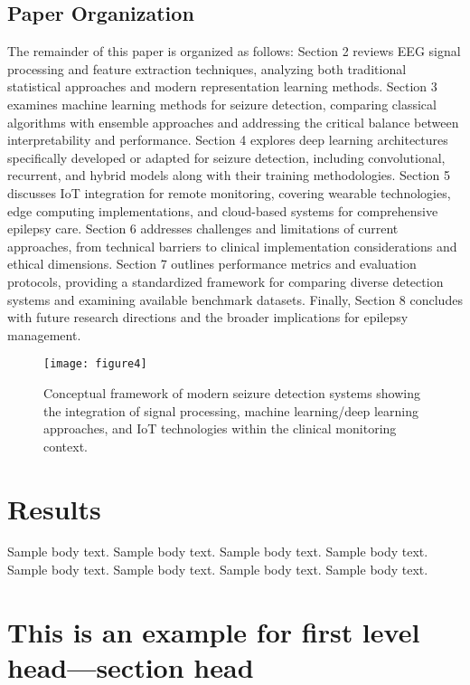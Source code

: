 \documentclass[pdflatex,sn-mathphys-num]{sn-jnl}%
\theoremstyle{thmstyleone}%
\theoremstyle{thmstyletwo}%
\theoremstyle{thmstylethree}%
\begin{document}
\subsection{Paper Organization}

The remainder of this paper is organized as follows: Section 2 reviews EEG signal processing and feature extraction techniques, analyzing both traditional statistical approaches and modern representation learning methods. Section 3 examines machine learning methods for seizure detection, comparing classical algorithms with ensemble approaches and addressing the critical balance between interpretability and performance. Section 4 explores deep learning architectures specifically developed or adapted for seizure detection, including convolutional, recurrent, and hybrid models along with their training methodologies. Section 5 discusses IoT integration for remote monitoring, covering wearable technologies, edge computing implementations, and cloud-based systems for comprehensive epilepsy care. Section 6 addresses challenges and limitations of current approaches, from technical barriers to clinical implementation considerations and ethical dimensions. Section 7 outlines performance metrics and evaluation protocols, providing a standardized framework for comparing diverse detection systems and examining available benchmark datasets. Finally, Section 8 concludes with future research directions and the broader implications for epilepsy management.

\begin{figure}[h]
    \centering
    \texttt{[image: figure4]}
    \caption{Conceptual framework of modern seizure detection systems showing the integration of signal processing, machine learning/deep learning approaches, and IoT technologies within the clinical monitoring context.}
    \label{fig:conceptual_framework}
\end{figure} 

\section{Results}\label{sec2}

Sample body text. Sample body text. Sample body text. Sample body text. Sample body text. Sample body text. Sample body text. Sample body text.

\section{This is an example for first level head---section head}\label{sec3}
\end{document}
